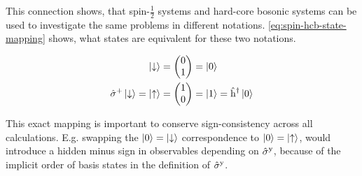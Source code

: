 This connection shows, that spin-$\frac{1}{2}$ systems and hard-core bosonic systems can be used to investigate the same problems in different notations.
\autoref{eq:spin-hcb-state-mapping} shows, what states are equivalent for these two notations.

\begin{equation}
    \label{eq:spin-hcb-state-mapping}
    \begin{split}
        \ketN[\down] &= \left(\begin{matrix}
            0 \\
            1
        \end{matrix}\right) = \ketN[0] \\
        \pauli[]{+}\ketN[\down] = \ketN[\up] &= \left(\begin{matrix}
            1 \\
            0
        \end{matrix}\right) = \ketN[1] = \hop{}{\dagger}\ketN[0] \\
    \end{split}
\end{equation}

This exact mapping is important to conserve sign-consistency across all calculations. 
E.g. swapping the $\ketN[0] = \ketN[\down]$ correspondence to $\ketN[0] = \ketN[\up]$, would introduce a hidden minus sign in observables depending on $\pauli[]{y}$, because of the implicit order of basis states in the definition of $\pauli[]{y}$.